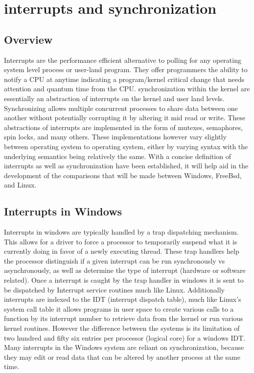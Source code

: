 \section{interrupts and synchronization}
\subsection{Overview}
Interrupts are the performance efficient alternative to polling for any operating system level process or user-land program. They offer programmers the ability to notify a CPU at anytime indicating a program/kernel critical change that needs attention and quantum time from the CPU. synchronization within the kernel are essentially an abstraction of interrupts on the kernel and user land levels. Synchronizing allows multiple concurrent processes to share data between one another without potentially corrupting it by altering it mid read or write. These abstractions of interrupts are implemented in the form of mutexes, semaphores, spin locks, and many others. These implementations however vary slightly between operating system to operating system, either by varying syntax with the underlying semantics being relatively the same. With a concise definition of interrupts as well as synchronization have been established, it will help aid in the development of the comparisons that will be made between Windows, FreeBsd, and Linux.
\subsection{Interrupts in Windows}
Interrupts in windows are typically handled by a trap dispatching mechanism. This allows for a driver to force a processor to temporarily suspend what it is currently doing in favor of a newly executing thread. These trap handlers help the processor distinguish if a given interrupt can be run synchronously vs asynchronously, as well as determine the type of interrupt (hardware or software related). Once a interrupt is caught by the trap handler in windows it is sent to be dispatched by Interrupt service routines much like Linux. Additionally interrupts are indexed to the IDT (interrupt dispatch table), much like Linux's system call table it allows programs in user space to create various calls to a function by its interrupt number to retrieve data from the kernel or run various kernel routines. However the difference between the systems is its limitation of two hundred and fifty six entries per processor (logical core) for a windows IDT\cite{windowsbookpt1}. Many interrupts in the Windows system are reliant on synchronization, because they may edit or read data that can be altered by another process at the same time.
